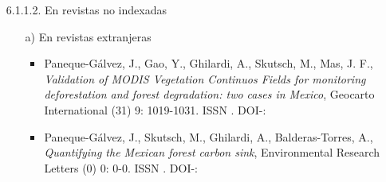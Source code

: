 \documentclass[12pt]{report}
\begin{document}
\begin{enumerate}
\begin{enumerate}
{\begin{enumerate}
\begin{enumerate}
\begin{itemize}
\begin{itemize}
                                                                                        \item{  Ghilardi, A., Masera, O. R., Espinoza-Medrano, B.,\textit{ The carbon footprint of traditional woodfuels}, Nature Climate Change (5) 0: 266-272. ISSN . DOI-:  (Web of Science: SCI/SSCI/SCI-EX [IF: 15,300])}

                                                                                        \item{  Ghilardi, A., Masera, O. R., Espinoza-Medrano, B.,\textit{ Environmental Burden of Traditional Bioenergy Use}, Annual Review of Environment and Resources (40) 0: 121-150. ISSN . DOI-:  (Web of Science: SCI/SSCI/SCI-EX [IF: 5,890])}

                                                                                        \item{  Ghilardi, A., Oyama, A. K., Masera, O. R.,\textit{ Análisis de la producción de carbón vegetal en la Cuenca del Lago de Cuitzeo, Michoacán, México: implicaciones para una producción sustentable}, Investigación Ambiental (6) 2: 127-138. ISSN . DOI-:  (Otros Indices)}

                                                                                \end{itemize}

                                                                \end{itemize}



                                                        \item[6.1.1.2.] En revistas no indexadas
                                                                \begin{itemize}


                                            \item[a)] En revistas extranjeras
                                                \begin{itemize}

                                                        \item{  Paneque-Gálvez, J., Gao, Y., Ghilardi, A., Skutsch, M., Mas, J. F.,\textit{ Validation of MODIS Vegetation Continuos Fields for monitoring deforestation and forest degradation: two cases in Mexico}, Geocarto International (31) 9: 1019-1031. ISSN . DOI-:  }

                                                        \item{  Paneque-Gálvez, J., Skutsch, M., Ghilardi, A., Balderas-Torres, A.,\textit{ Quantifying the Mexican forest carbon sink}, Environmental Research Letters (0) 0: 0-0. ISSN . DOI-:  }


\end{itemize}
\end{itemize}
\end{enumerate}
\end{enumerate}}
\end{enumerate}
\end{enumerate}
\end{document}
